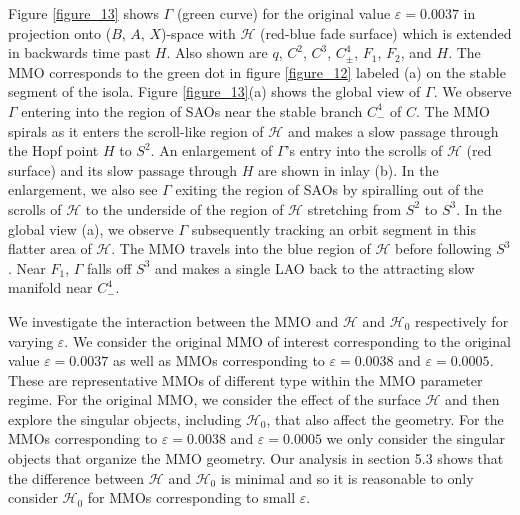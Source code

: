 \documentclass{ws-ijbc}
\begin{document}
Figure \ref{figure_13} shows $\Gamma$ (green curve) for the original value $\varepsilon=0.0037$ in projection onto ($B$, $A$, $X$)-space with $\mathscr{H}$ (red-blue fade surface) which is extended in backwards time past $H$.  Also shown are $q$, $C^2$, $C^3$, $C^4_\pm$, $F_1$, $F_2$, and $H$.  The MMO corresponds to the green dot in figure \ref{figure_12} labeled (a) on the stable segment of the isola.  Figure \ref{figure_13}(a) shows the global view of $\Gamma$.  We observe $\Gamma$ entering into the region of SAOs near the stable branch $C^4_-$ of $C$.  The MMO spirals as it enters the scroll-like region of $\mathscr{H}$ and makes a slow passage through the Hopf point $H$ to $S^2$.  An enlargement of $\Gamma$'s entry into the scrolls of $\mathscr{H}$ (red surface) and its slow passage through $H$ are shown in inlay (b).  In the enlargement, we also see $\Gamma$ exiting the region of SAOs by spiralling out of the scrolls of $\mathscr{H}$ to the underside of the region of $\mathscr{H}$ stretching from $S^2$ to $S^3$.  In the global view (a), we observe $\Gamma$ subsequently tracking an orbit segment in this flatter area of $\mathscr{H}$.  The MMO travels into the blue region of $\mathscr{H}$ before following $S^3$.  Near $F_1$, $\Gamma$ falls off $S^3$ and makes a single LAO back to the attracting slow manifold near $C^4_-$.









We investigate the interaction between the MMO and $\mathscr{H}$ and $\mathscr{H}_0$ respectively for varying $\varepsilon$.  We consider the original MMO of interest corresponding to the original value $\varepsilon=0.0037$ as well as MMOs corresponding to $\varepsilon=0.0038$ and $\varepsilon=0.0005$.  These are representative MMOs of different type within the MMO parameter regime.  For the original MMO, we consider the effect of the surface $\mathscr{H}$ and then explore the singular objects, including $\mathscr{H}_0$, that also affect the geometry.  For the MMOs corresponding to $\varepsilon=0.0038$ and $\varepsilon=0.0005$ we only consider the singular objects that organize the MMO geometry.  Our analysis in section 5.3 shows that the difference between $\mathscr{H}$ and $\mathscr{H}_0$ is minimal and so it is reasonable to only consider $\mathscr{H}_0$ for MMOs corresponding to small $\varepsilon$.
\end{document}
